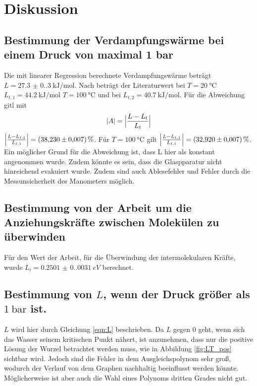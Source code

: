 \section{Diskussion}
\label{sec:Diskussion}
\subsection{Bestimmung der Verdampfungswärme bei einem Druck von maximal 1 bar}
Die mit linearer Regression berechnete Verdampfungswärme beträgt $L=\qty{27.3(0.3)}{\kilo\joule\per\mole}$.
Nach \cite{LWasser} beträgt der Literaturwert bei $T=\qty{20}{\celsius}$ $L_{t,1}=\qty{44.2}{\kilo\joule\per\mole}$ $T=\qty{100}{\celsius}$ und bei $L_{t,2}=\qty{40.7}{\kilo\joule\per\mole}$.
Für die Abweichung gitl mit 
\begin{equation}
    |A|=\Bigl|\frac{L-L_t}{L_t}\Bigr|
    \label{eqn:abweichung}
\end{equation}
$\Bigl|\frac{L-L_{t,1}}{L_{t,1}}\Bigr|=\qty{38.23(0.007)}{\percent}$. 
Für $T=\qty{100}{\celsius}$ gilt $\Bigl|\frac{L-L_{t,1}}{L_{t,1}}\Bigr|=\qty{32.92(0.007)}{\percent}$.
Ein möglicher Grund für die Abweichung ist, dass L hier als konstant angenommen wurde.
Zudem könnte es sein, dass die Glaspparatur nicht hinreichend evakuiert wurde.  
Zudem sind auch Ablesefehler und Fehler durch die Messunsicherheit des Manometers möglich. 

\subsection{Bestimmung von der Arbeit um die Anziehungskräfte zwischen Molekülen zu überwinden}
Für den Wert der Arbeit, für die Überwindung der intermolekularen Kräfte, wurde $L_i=\qty{0.2501(0.0031)}{eV}$ berechnet.

\subsection{Bestimmung von $L$, wenn der Druck größer als $\qty{1}{\bar}$ ist.}
$L$ wird hier durch Gleichung \ref{eqn:L} beschrieben. Da $L$ gegen 0 geht, wenn sich das Wasser seinem kritischen Punkt
nähert, ist anzunehmen, dass nur die positive Lösung der Wurzel betrachtet werden muss, wie in Abbildung \ref{fig:LT_pos}
sichtbar wird. Jedoch sind die Fehler in dem Ausgleichspolynom sehr groß, wodurch der Verlauf von dem Graphen nachhaltig
beeinflusst werden könnte. Möglicherweise ist aber auch die Wahl eines Polynoms dritten Grades nicht gut.

